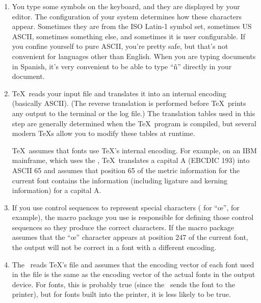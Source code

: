\begin{enumerate}
\item You type some symbols on the keyboard, and they are displayed by
your editor.  The configuration of your system determines how these characters
appear.  Sometimes they are from the ISO Latin-1 symbol set, sometimes US
ASCII, sometimes something else, and sometimes it is user configurable.  If
you confine yourself to pure ASCII, you're pretty safe, but that's not
convenient for languages other than English.  When you are typing documents
in Spanish, it's very convenient to be able to type ``\~n'' directly in your
document.

\item \TeX\ reads your input file and translates it into an internal
encoding (basically ASCII).  (The reverse translation is performed
before \TeX\ prints any output to the terminal or the log file.)
The translation tables used in this step are generally determined when
the \TeX\ program is compiled, but several modern \TeX{}s allow you
to modify these tables at runtime.

\TeX\ assumes that fonts use \TeX's internal encoding.  For example, on
an IBM mainframe, which uses the , \TeX\ translates
a capital A (EBCDIC 193) into ASCII 65 and assumes that
position 65 of the metric
information for the current font contains the information
(including ligature and kerning information) for a capital A.


\item If you use control sequences to represent special characters
( for ``\oe'', for example), the macro package you 
use is responsible for defining those control sequences so they
produce the correct characters.  If the macro package 
assumes that the ``\oe'' character appears at position 247 of the current
font, the output will not be correct in a font with a
different encoding.

\item The \dvidriver\ reads \TeX's  file and assumes that the
encoding vector of each font used in the  file is the same as
the encoding vector of the actual fonts in the output device.  For
 fonts, this is probably true (since the \dvidriver\ sends the
font to the printer), but for fonts built into the printer, it is less
likely to be true.
\end{enumerate}

